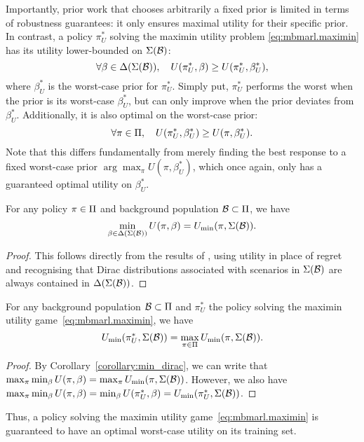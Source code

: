 Importantly, prior work that chooses arbitrarily a fixed prior is limited in terms of robustness guarantees: it only ensures maximal utility for their specific prior. In contrast, a policy $\pi^*_U$ solving the maximin utility problem \eqref{eq:mbmarl.maximin} has its utility lower-bounded on $\Sigma(\mathcal{B})$:
\begin{equation}
    \label{eq:utility_lower_bound}
    \forall \beta \in \Delta(\Sigma(\mathcal{B})), \quad U(\pi^*_U, \beta) \geq U(\pi^*_U, \beta^*_U),
\end{equation}
where $\beta^*_U$ is the worst-case prior for $\pi^*_U$.
Simply put, $\pi^*_U$ performs the worst when the prior is its worst-case $\beta^*_U$, but can only improve when the prior deviates from $\beta^*_U$. Additionally, it is also optimal on the worst-case prior:
\begin{equation}
\label{eq:best_on_worst_case_prior}
    \forall \pi\in\Pi, \quad U(\pi^*_U, \beta^*_U) \geq U(\pi, \beta^*_U).
\end{equation}
Note that this differs fundamentally from merely finding the best response to a fixed worst-case prior $\arg\max_{\pi} U(\pi, \beta^*_U)$, which once again, only has a guaranteed optimal utility on $\beta^*_U$.
\begin{corollary}
    \label{corollary:min_dirac}
    For any policy $\pi\in\Pi$ and background population $\mathcal{B} \subset \Pi$, we have 
    \begin{equation}
        \min_{\beta\in\Delta(\Sigma(\mathcal{B}))} U(\pi, \beta)= U_\text{min}(\pi, \Sigma(\mathcal{B})). 
    \end{equation}
\end{corollary}
\begin{proof}
    This follows directly from the results of \citet{buening_minimax_bayes_reinforcement_2023}, using utility in place of regret and recognising that Dirac distributions associated with scenarios in $\Sigma(\mathcal{B})$ are always contained in $\Delta(\Sigma(\mathcal{B}))$.
\end{proof}
\begin{lemma}
    For any background population $\mathcal{B} \subset \Pi$ and $\pi^*_U$ the policy solving the maximin utility game~\eqref{eq:mbmarl.maximin}, we have
    \begin{equation}
    \label{eq:optimal_worst_case_utility}
    U_\text{min}(\pi^*_U, \Sigma(\mathcal{B})) = \max_{\pi\in\Pi} U_\text{min}(\pi, \Sigma(\mathcal{B})).
    \end{equation}
\end{lemma}
\begin{proof}
    By Corollary~\ref{corollary:min_dirac}, we can write that $\max_{\pi}\min_{\beta} U(\pi, \beta)=\max_{\pi}U_\text{min}(\pi, \Sigma(\mathcal{B}))$.
    However, we also have $\max_{\pi}\min_{\beta} U(\pi, \beta) = \min_{\beta} U(\pi^*_U, \beta) = U_\text{min}(\pi^*_U,\Sigma(\mathcal{B}))$.
\end{proof}
Thus, a policy solving the maximin utility game~\eqref{eq:mbmarl.maximin} is guaranteed to have an optimal worst-case utility on its training set.




